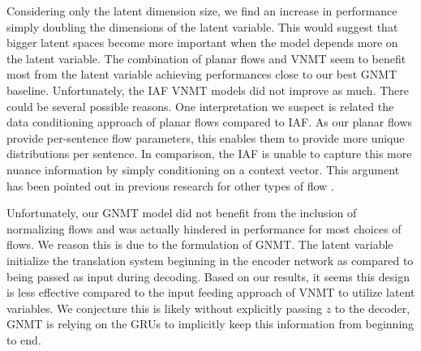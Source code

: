 Considering only the latent dimension size, we find an increase in performance simply doubling the dimensions of the latent variable. This would suggest that bigger latent spaces become more important when the model depends more on the latent variable. The combination of planar flows and \ac{VNMT} seem to benefit most from the latent variable achieving performances close to our best \ac{GNMT} baseline. Unfortunately, the \ac{IAF} \ac{VNMT} models did not improve as much. There could be several possible reasons. One interpretation we suspect is related the data conditioning approach of planar flows compared to \ac{IAF}. As our planar flows provide per-sentence flow parameters, this enables them to provide more unique distributions per sentence. In comparison, the \ac{IAF} is unable to capture this more nuance information by simply conditioning on a context vector. This argument has been pointed out in previous research for other types of flow \cite{Berg2018SylvesterNF}.

 Unfortunately, our \ac{GNMT} model did not benefit from the inclusion of normalizing flows and was actually hindered in performance for most choices of flows. We reason this is due to the formulation of \ac{GNMT}. The latent variable initialize the translation system beginning in the encoder network as compared to being passed as input during decoding. Based on our results, it seems this design is less effective compared to the input feeding approach of \ac{VNMT} to utilize latent variables. We conjecture this is likely without explicitly passing $z$ to the decoder, \ac{GNMT} is relying on the \ac{GRU}s to implicitly keep this information from beginning to end. 



